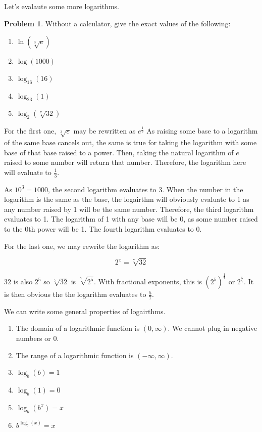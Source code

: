 \documentclass[12pt]{article}
\theoremstyle{definition}
\newtheorem{problem}{Problem}
\begin{document}
Let's evalaute some more logarithms.

\begin{problem}
Without a calculator, give the exact values of the following:
\begin{enumerate}
    \item $\ln(\sqrt[3]{e})$
    \item $\log(1000)$
    \item $\log_{16}(16)$
    \item $\log_{23}(1)$
    \item $\log_2(\sqrt[7]{32})$
\end{enumerate}
\end{problem}

For the first one, $\sqrt[3]{e}$ may be rewritten as $e^{\frac{1}{3}}$
As raising some base to a logarithm of the same base cancels out, the same is true for taking the logarithm with some base of that base raised to a power.
Then, taking the natural logarithm of $e$ raised to some number will return that number.
Therefore, the logarithm here will evaluate to $\frac{1}{3}$.

As $10^3=1000$, the second logarithm evaluates to 3.
When the number in the logarithm is the same as the base, the logairthm will obviously evaluate to 1 as any number raised by 1 will be the same number.
Therefore, the third logarithm evaluates to 1.
The logarithm of 1 with any base will be 0, as some number raised to the 0th power will be 1.
The fourth logarithm evaluates to 0.

For the last one, we may rewrite the logarithm as:

\begin{equation}
    2^x = \sqrt[7]{32}
\end{equation}

32 is also $2^5$ so $\sqrt[7]{32}$ is $\sqrt[7]{2^5}$.
With fractional exponents, this is $\left(2^5\right)^{\frac{1}{7}}$ or $2^\frac{5}{7}$.
It is then obvious the the logarithm evaluates to $\frac{5}{7}$.

We can write some general properties of logairthms.

\begin{enumerate}
    \item The domain of a logarithmic function is $(0, \infty)$. We cannot plug in negative numbers or 0.
    \item The range of a logarithmic function is $(-\infty, \infty)$.
    \item $\log_b(b)=1$
    \item $\log_b(1)=0$
    \item $\log_b(b^x)=x$
    \item $b^{\log_b(x)}=x$
\end{enumerate}
\end{document}

